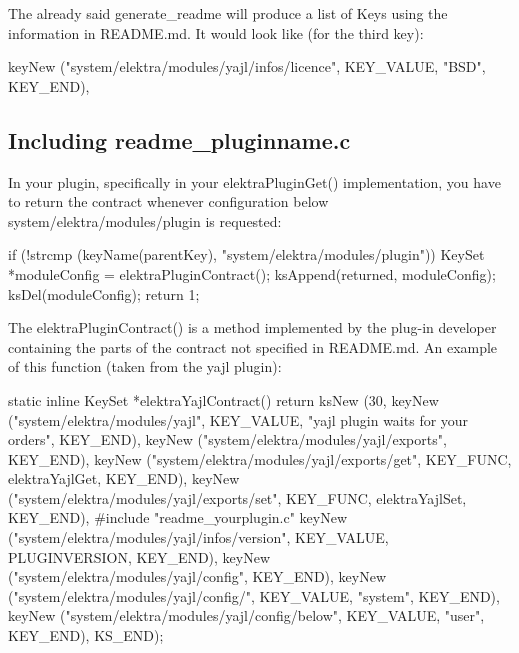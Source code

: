 The already said generate\+\_\+readme will produce a list of Keys using the information in R\+E\+A\+D\+M\+E.\+md. It would look like (for the third key)\+: \begin{DoxyVerb}            keyNew ("system/elektra/modules/yajl/infos/licence",
                    KEY_VALUE, "BSD", KEY_END),
\end{DoxyVerb}


\subsection*{Including readme\+\_\+pluginname.\+c}

In your plugin, specifically in your elektra\+Plugin\+Get() implementation, you have to return the contract whenever configuration below system/elektra/modules/plugin is requested\+: \begin{DoxyVerb}    if (!strcmp (keyName(parentKey), "system/elektra/modules/plugin"))
    {
            KeySet *moduleConfig = elektraPluginContract();
            ksAppend(returned, moduleConfig);
            ksDel(moduleConfig);
            return 1;
    }
\end{DoxyVerb}


The elektra\+Plugin\+Contract() is a method implemented by the plug-\/in developer containing the parts of the contract not specified in R\+E\+A\+D\+M\+E.\+md. An example of this function (taken from the yajl plugin)\+: \begin{DoxyVerb}    static inline KeySet *elektraYajlContract()
    {
            return ksNew (30,
            keyNew ("system/elektra/modules/yajl",
                    KEY_VALUE, "yajl plugin waits for your orders", KEY_END),
            keyNew ("system/elektra/modules/yajl/exports", KEY_END),
            keyNew ("system/elektra/modules/yajl/exports/get",
                    KEY_FUNC, elektraYajlGet,
                    KEY_END),
            keyNew ("system/elektra/modules/yajl/exports/set",
                    KEY_FUNC, elektraYajlSet,
                    KEY_END),
    #include "readme_yourplugin.c"
            keyNew ("system/elektra/modules/yajl/infos/version",
                    KEY_VALUE, PLUGINVERSION, KEY_END),
            keyNew ("system/elektra/modules/yajl/config", KEY_END),
            keyNew ("system/elektra/modules/yajl/config/",
                    KEY_VALUE, "system",
                    KEY_END),
            keyNew ("system/elektra/modules/yajl/config/below",
                    KEY_VALUE, "user",
                    KEY_END),
            KS_END);
    }
\end{DoxyVerb}


